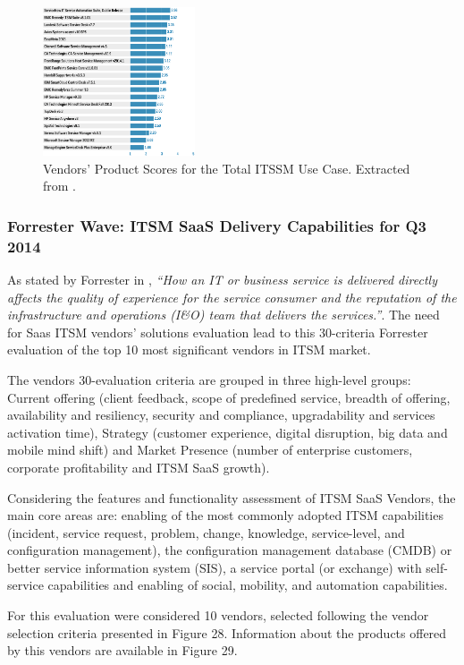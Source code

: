 \begin{figure}[!h]
\centering
\includegraphics[width=0.40\textwidth]{img/TotalITSMScores.png}
\caption{Vendors' Product Scores for the Total ITSSM Use Case. Extracted from \cite{criticalCapabilitiesITSM}.}
\end{figure}


\subsubsection{Forrester Wave: ITSM SaaS Delivery Capabilities for Q3 2014}

As stated by Forrester in \cite{forresterWaveITSM}, \textit{``How an IT or business service is delivered directly affects the quality of experience for the service consumer and the reputation of the infrastructure and operations (I\&O) team that delivers the services.''}. The need for Saas ITSM vendors' solutions evaluation lead to this 30-criteria Forrester evaluation of the top 10 most significant vendors in ITSM market.\par

The vendors 30-evaluation criteria are grouped in three high-level groups: Current offering (client feedback, scope of predefined service, breadth of offering, availability and resiliency, security and compliance, upgradability and services activation time), Strategy (customer experience, digital disruption, big data and mobile mind shift) and Market Presence (number of enterprise customers, corporate profitability and ITSM SaaS growth).\par
Considering the features and functionality assessment of ITSM SaaS Vendors, the main core areas are: enabling of the most commonly adopted ITSM capabilities (incident, service request, problem, change, knowledge, service-level, and configuration management), the configuration management database (CMDB) or better service information system (SIS), a service portal (or exchange) with self-service capabilities and enabling of social, mobility, and automation capabilities.\par
For this evaluation were considered 10 vendors, selected following the vendor selection criteria presented in Figure 28. Information about the products offered by this vendors are available in Figure 29.\par

